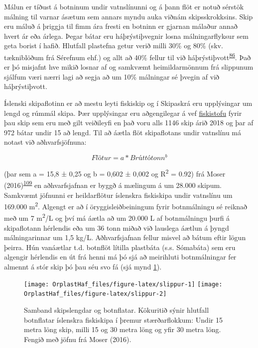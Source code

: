 \documentclass[icelandic,]{book}
\begin{document}
Málun er tíðust á botninum undir vatnslínunni og á þann flöt er notuð sérstök málning til varnar ásætum sem annars myndu auka viðnám skipsskrokksins. Skip eru máluð á þriggja til fimm ára fresti en botninn er gjarnan málaður annað hvert ár eða árlega. Þegar bátar eru háþrýstiþvegnir losna málningarflyksur sem geta borist í hafið. Hlutfall plastefna getur verið milli 30\% og 80\% (skv. tækniblöðum frá Sérefnum ehf.) og allt að 40\% fellur til við háþrýstiþvott\textsuperscript{\protect\hyperlink{ref-Verschoor2016}{86}}. Það er þó misjafnt hve mikið losnar af og samkvæmt heimildarmönnum frá slippunum sjálfum væri nærri lagi að segja að um 10\% málningar sé þvegin af við háþrýstiþvott.

Íslenski skipaflotinn er að mestu leyti fiskiskip og í Skipaskrá eru upplýsingar um lengd og rúmmál skipa. Þær upplýsingar eru aðgengilegar á vef \href{http://www.fiskistofa.is/}{fiskistofu} fyrir þau skip sem eru með gilt veiðileyfi en það voru alls 1146 skip árið 2018 og þar af 972 bátar undir 15 að lengd. Til að áætla flöt skipaflotans undir vatnslínu má notast við aðhvarfsjöfnuna:

\begin{equation} 
  Flötur = a*Brúttótonn^b
  \label{eq:WSA}
\end{equation}

(þar sem a = 15,8 ± 0,25 og b = 0,602 ± 0,002 og R\textsuperscript{2} = 0.92) frá Moser (2016)\textsuperscript{\protect\hyperlink{ref-Moser2016}{109}} en aðhvarfsjafnan er byggð á mælingum á um 28.000 skipum. Samkvæmt jöfnunni er heildarflötur íslenskra fiskiskipa undir vatnslínu um 169.000 m\textsuperscript{2}. Algengt er að í öryggisleiðbeiningum fyrir botnmálningu sé reiknað með um 7 m\textsuperscript{2}/L og því má áætla að um 20.000 L af botnmálningu þurfi á skipaflotann hérlendis eða um 36 tonn miðað við lauslega áætlun á þyngd málningarinnar um 1,5 kg/L. Aðhvarfsjafnan fellur misvel að bátum eftir lögun þeirra. Hún vanáætlar t.d. botnflöt lítilla plastbáta (s.s. Sómabáta) sem eru algengir hérlendis en út frá henni má þó sjá að meirihluti botnmálningar fer almennt á stór skip þó þau séu svo fá (sjá mynd \ref{fig:slippur}).

\begin{figure}

{\centering \texttt{[image: OrplastHaf\_files/figure-latex/slippur-1]} \texttt{[image: OrplastHaf\_files/figure-latex/slippur-2]} 

}

\caption{Samband skipslengdar og botnflatar. Kökuritið sýnir hlutfall botnflatar íslenskra fiskiskipa í þremur stærðarflokkum: Undir 15 metra löng skip, milli 15 og 30 metra löng og yfir 30 metra löng. Fengið með jöfnu frá Moser (2016).}\label{fig:slippur}
\end{figure}
\end{document}
